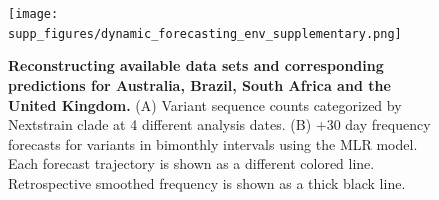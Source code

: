 \documentclass[11pt,oneside,letterpaper]{article}
\begin{document}



\newpage

\setcounter{figure}{0}
\setcounter{table}{0}
\renewcommand{\thefigure}{S\arabic{figure}}
\renewcommand{\thetable}{S\arabic{table}}

\begin{figure}[tb!]
	\centering
	\texttt{[image: supp\_figures/dynamic\_forecasting\_env\_supplementary.png]}
	\caption{
		\textbf{Reconstructing available data sets and corresponding predictions for Australia, Brazil, South Africa and the United Kingdom.}
		(A) Variant sequence counts categorized by Nextstrain clade at 4 different analysis dates.
		(B) +30 day frequency forecasts for variants in bimonthly intervals using the MLR model.
		Each forecast trajectory is shown as a different colored line.
		Retrospective smoothed frequency is shown as a thick black line.
	}
	\label{fig:dynamic_forecasting_env_supplementary}
\end{figure}
\end{document}
